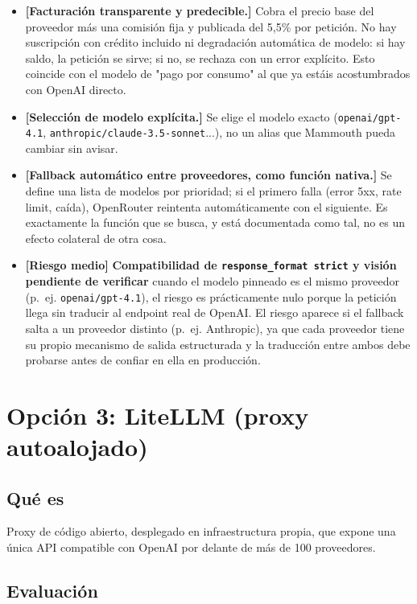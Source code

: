 \documentclass[11pt,a4paper]{article}
\newcommand{\advertencia}[1]{\textcolor{riesgomedio}{\textbf{[#1]}}}
\newcommand{\ok}[1]{\textcolor{riesgobajo}{\textbf{[#1]}}}
\begin{document}
\begin{itemize}
    \item \ok{Facturación transparente y predecible.} Cobra el precio base del
    proveedor más una comisión fija y publicada del 5,5\% por petición. No hay
    suscripción con crédito incluido ni degradación automática de modelo: si
    hay saldo, la petición se sirve; si no, se rechaza con un error explícito.
    Esto coincide con el modelo de "pago por consumo" al que ya estáis
    acostumbrados con OpenAI directo.
    \item \ok{Selección de modelo explícita.} Se elige el modelo exacto
    (\texttt{openai/gpt-4.1}, \texttt{anthropic/claude-3.5-sonnet}...), no un
    alias que Mammouth pueda cambiar sin avisar.
    \item \ok{Fallback automático entre proveedores, como función nativa.} Se
    define una lista de modelos por prioridad; si el primero falla (error 5xx,
    rate limit, caída), OpenRouter reintenta automáticamente con el siguiente.
    Es exactamente la función que se busca, y está documentada como tal, no es
    un efecto colateral de otra cosa.
    \item \advertencia{Riesgo medio} \textbf{Compatibilidad de
    \texttt{response\_format strict} y visión pendiente de verificar} cuando el
    modelo pinneado es el mismo proveedor (p.~ej. \texttt{openai/gpt-4.1}), el
    riesgo es prácticamente nulo porque la petición llega sin traducir al
    endpoint real de OpenAI. El riesgo aparece si el fallback salta a un
    proveedor distinto (p.~ej. Anthropic), ya que cada proveedor tiene su
    propio mecanismo de salida estructurada y la traducción entre ambos debe
    probarse antes de confiar en ella en producción.
\end{itemize}

\section{Opción 3: LiteLLM (proxy autoalojado)}

\subsection{Qué es}
Proxy de código abierto, desplegado en infraestructura propia, que expone una
única API compatible con OpenAI por delante de más de 100 proveedores.

\subsection{Evaluación}
\end{document}
